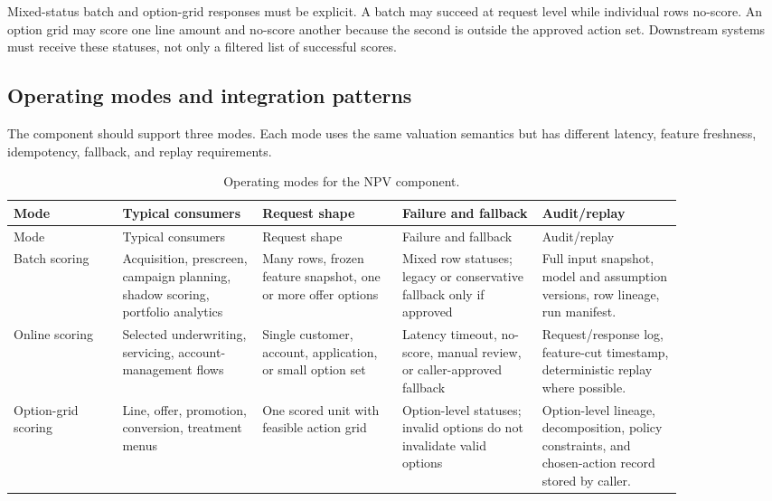 \documentclass[11pt]{article}
\newcommand{\1}{\mathbf{1}}
\begin{document}
Mixed-status batch and option-grid responses must be explicit. A batch may
succeed at request level while individual rows no-score. An option grid may
score one line amount and no-score another because the second is outside the
approved action set. Downstream systems must receive these statuses, not only a
filtered list of successful scores.

\subsection{Operating modes and integration patterns}
\label{subsec:operating-modes}

The component should support three modes. Each mode uses the same valuation
semantics but has different latency, feature freshness, idempotency, fallback,
and replay requirements.

\begin{longtable}{L{0.14\linewidth}L{0.18\linewidth}L{0.18\linewidth}L{0.18\linewidth}L{0.18\linewidth}}
\caption{Operating modes for the NPV component.}
\label{tab:operating-modes}\\
\toprule
Mode & Typical consumers & Request shape & Failure and fallback & Audit/replay \\
\midrule
\endfirsthead
\toprule
Mode & Typical consumers & Request shape & Failure and fallback & Audit/replay \\
\midrule
\endhead
Batch scoring
  & Acquisition, prescreen, campaign planning, shadow scoring, portfolio
    analytics
  & Many rows, frozen feature snapshot, one or more offer options
  & Mixed row statuses; legacy or conservative fallback only if approved
  & Full input snapshot, model and assumption versions, row lineage, run
    manifest. \\
Online scoring
  & Selected underwriting, servicing, account-management flows
  & Single customer, account, application, or small option set
  & Latency timeout, no-score, manual review, or caller-approved fallback
  & Request/response log, feature-cut timestamp, deterministic replay where
    possible. \\
Option-grid scoring
  & Line, offer, promotion, conversion, treatment menus
  & One scored unit with feasible action grid
  & Option-level statuses; invalid options do not invalidate valid options
  & Option-level lineage, decomposition, policy constraints, and chosen-action
    record stored by caller. \\
\bottomrule
\end{longtable}
\end{document}
